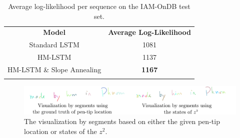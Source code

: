 \documentclass{article} %
\begin{document}
\begin{table}[t]
    \vspace*{-0.5cm}
	\centering
    {\small
    \begin{tabular}{c c }
        \Xhline{0.8pt}
        \multicolumn{2}{c}{\bf IAM-OnDB}\\
        \hline
        {\bf Model} & {\bf Average Log-Likelihood} \\
        \hline
        Standard LSTM & 1081 \\
        HM-LSTM & 1137 \\
        HM-LSTM \& Slope Annealing & {\bf 1167} \\
        \Xhline{0.8pt}
    \end{tabular}
    }
   	\caption{Average log-likelihood per sequence on the IAM-OnDB test set.}
    \label{tab:iamondb_nll}
\end{table}



\begin{figure}[t]
    \vspace*{-0.3cm}
	\begin{minipage}{1.\columnwidth}
    	\centering
     	\includegraphics[width=1.\columnwidth]{handwriting_boundary.pdf}
    \end{minipage}
    \caption{The visualization by segments based on either the given pen-tip location or states of the $z^2$.}
    \label{fig:iamondb_bound} 
\end{figure}
\end{document}

